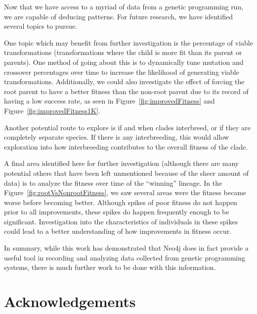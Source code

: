 \documentclass[12pt]{article}
\begin{document}
Now that we have access to a myriad of data from a genetic programming run, we are capable of deducing patterns. For future research, we have identified several topics to pursue.

One topic which may benefit from further investigation is the percentage of viable transformations (transformations where the child is more fit than its parent or parents). One method of going about this is to dynamically tune mutation and crossover percentages over time to increase the likelihood of generating viable transformations. Additionally, we could also investigate the effect of forcing the root parent to have a better fitness than the non-root parent due to its record of having a low success rate, as seen in Figure~\ref{fig:improvedFitness} and Figure~\ref{fig:improvedFitness1K}.

Another potential route to explore is if and when clades interbreed, or if they are completely separate species. If there is any interbreeding, this would allow exploration into how interbreeding contributes to the overall fitness of the clade. 

A final area identified here for further investigation (although there are many potential others that have been left unmentioned because of the sheer amount of data) is to analyze the fitness over time of the ``winning'' lineage. In the Figure~\ref{fig:rootVsNonrootFitness}, we saw several areas were the fitness became worse before becoming better. Although spikes of poor fitness do not happen prior to all improvements, these spikes do happen frequently enough to be significant. Investigation into the characteristics of individuals in these spikes could lead to a better understanding of how improvements in fitness occur.

In summary, while this work has demonstrated that Neo4j does in fact provide a useful tool in recording and analyzing data collected from genetic programming systems, there is much further work to be done with this information.

\section*{Acknowledgements}



\end{document}
